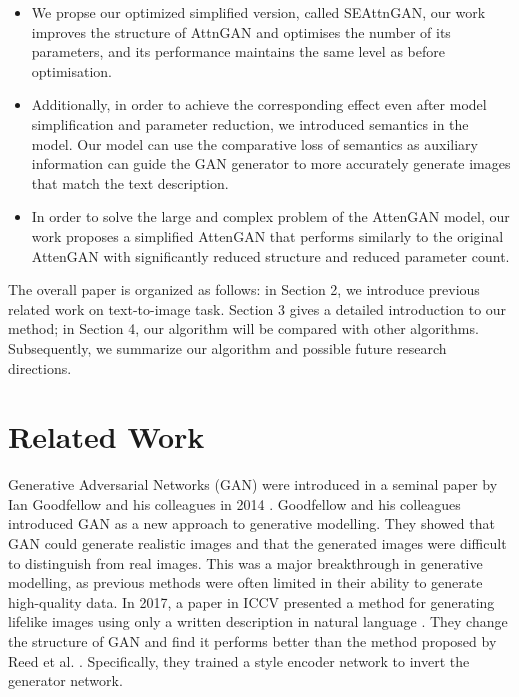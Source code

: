 \documentclass[runningheads, orivec]{llncs}
\begin{document}
\begin{itemize}
  \item We propse our optimized simplified version, called SEAttnGAN, our work improves the structure of AttnGAN and optimises the number of its parameters, and its performance maintains the same level as before optimisation. 
  \item Additionally, in order to achieve the corresponding effect even after model simplification and parameter reduction, we introduced semantics in the model. Our model can use the comparative loss of semantics as auxiliary information can guide the GAN generator to more accurately generate images that match the text description. 
  \item In order to solve the large and complex problem of the AttenGAN model, our work proposes a simplified AttenGAN that performs similarly to the original AttenGAN with significantly reduced structure and reduced parameter count. 
\end{itemize}

\par The overall paper is organized as follows: in Section 2, we introduce previous related work on text-to-image task. Section 3 gives a detailed introduction to our method; in Section 4, our algorithm will be compared with other algorithms. Subsequently, we summarize our algorithm and possible future research directions.
\vspace{-10pt}

\section{Related Work} 

Generative Adversarial Networks (GAN) were introduced in a seminal paper by Ian Goodfellow and his colleagues in 2014 \cite{goodfellow2020generative}. Goodfellow and his colleagues introduced GAN as a new approach to generative modelling. They showed that GAN could generate realistic images and that the generated images were difficult to distinguish from real images. This was a major breakthrough in generative modelling, as previous methods were often limited in their ability to generate high-quality data. In 2017, a paper in ICCV presented a method for generating lifelike images using only a written description in natural language \cite{dong2017semantic}. They change the structure of GAN and find it performs better than the method proposed by Reed et al. \cite{reed2016generative}. Specifically, they trained a style encoder network to invert the generator network.
\end{document}
